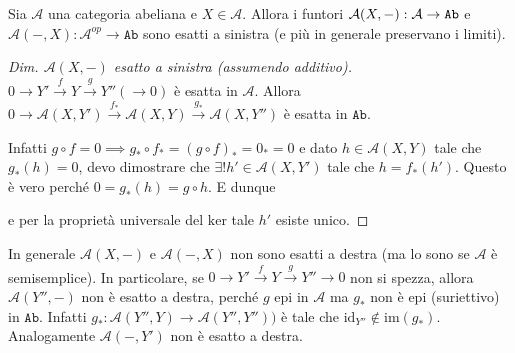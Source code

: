 \begin{example}{}
    Sia \(\mathcal{A}\) una categoria abeliana e \(X \in \mathcal{A}\). Allora i
    funtori \(\mathcal{A}{(X, \--)} : \mathcal{A} \to \mathtt{Ab}\) e \(\mathcal{A}{(-, X)} : \mathcal{A}^{op} \to \mathtt{Ab}\) sono esatti a sinistra (e più in generale preservano i limiti).

    \begin{proof}[Dim. \(\mathcal{A}{(X, -)}\) esatto a sinistra (assumendo
        additivo)]
        \(0 \to Y' \overset{f}{\to}  Y \overset{g}{\to}  Y'' {(\to 0)}\) è
        esatta in \(\mathcal{A}\). Allora \(0 \to \mathcal{A}{(X, Y')} \overset{f_*}{\to} \mathcal{A}{(X, Y)} \overset{g_*}{\to} \mathcal{A}{(X, Y'')}\) è esatta in \(\mathtt{Ab}\).

        Infatti \(g \circ f = 0 \implies g_* \circ f_* = {(g \circ f)}_* = 0_* =
        0\) e dato \(h \in \mathcal{A}{(X, Y)}\) tale che \(g_*{(h)} = 0\), devo
        dimostrare che \(\exists ! h' \in \mathcal{A}{(X, Y')}\) tale che \(h =
        f_*{(h')}\). Questo è vero perché \(0 = g_*{(h)} = g \circ h\). E dunque 
    e per la proprietà universale del \(\mathrm{ker}\) tale \(h'\) esiste unico.
    \end{proof}

    In generale \(\mathcal{A}{(X, -)}\) e \(\mathcal{A}{(-, X)}\) non sono
    esatti a destra (ma lo sono se \(\mathcal{A}\) è semisemplice). In
    particolare, se \( 0 \to Y' \overset{f}{\to}  Y \overset{g}{\to}  Y'' \to
    0\) non si spezza, allora \(\mathcal{A}{(Y'', -)}\) non è esatto a destra,
    perché \(g\) epi in \(\mathcal{A}\) ma \(g_*\) non è epi (suriettivo) in
    \(\mathtt{Ab}\). Infatti \(g_* : \mathcal{A}{(Y'', Y)} \to \mathcal{A}{(Y'',
    Y'')})\) è tale che \(\mathrm{id}_{Y''} \not\in \mathrm{im}{(g_*)}\).
    Analogamente \(\mathcal{A}{(-, Y')}\) non è esatto a destra.
\end{example}

